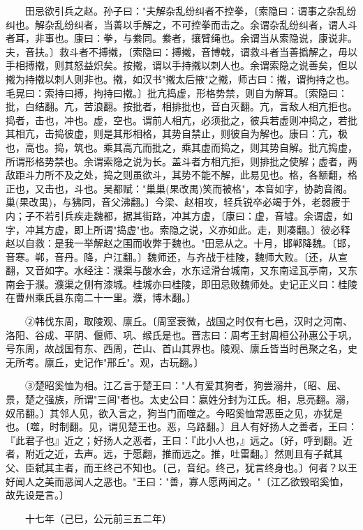 　　田忌欲引兵之赵。孙子曰："夫解杂乱纷纠者不控拳，〔索隐曰：谓事之杂乱纷纠也。解杂乱纷纠者，当善以手解之，不可控拳而击之。余谓杂乱纷纠者，谓人斗者耳，非事也。康曰：拳，与絭同。絭者，攘臂绳也。余谓当从索隐说，康说非。夫，音扶。〕救斗者不搏撠，〔索隐曰：搏撠，音博戟，谓救斗者当善撝解之，毋以手相搏撠，则其怒益炽矣。按撠，谓以手持撠以刺人也。余谓索隐之说善矣，但以撠为持撠以刺人则非也。撠，如汉书"撠太后掖"之撠，师古曰：撠，谓拘持之也。毛晃曰：索持曰搏，拘持曰撠。〕批亢捣虚，形格势禁，则自为解耳。〔索隐曰：批，白结翻。亢，苦浪翻。按批者，相排批也，音白灭翻。亢，言敌人相亢拒也。捣者，击也，冲也。虚，空也。谓前人相亢，必须批之，彼兵若虚则冲捣之，若批其相亢，击捣彼虚，则是其形相格，其势自禁止，则彼自为解也。康曰：亢，极也，高也。捣，筑也。乘其高亢而批之，乘其虚而捣之，则其势自解。批亢捣虚，所谓形格势禁也。余谓索隐之说为长。盖斗者方相亢拒，则排批之使解；虚者，两敌距斗力所不及之处，捣之则虽欲斗，其势不能不解，此易见也。格，各额翻，格正也，又击也，斗也。吴都赋："巢巢(果改禺)笑而被格"，本音如字，协韵音阁。巢(果改禺)，与狒同，音父沸翻。〕今梁、赵相攻，轻兵锐卒必竭于外，老弱疲于内；子不若引兵疾走魏都，据其街路，冲其方虚，〔康曰：虚，音墟。余谓虚，如字，冲其方虚，即上所谓"捣虚"也。索隐之说，义亦如此。走，则凑翻。〕彼必释赵以自救：是我一举解赵之围而收弊于魏也。"田忌从之。十月，邯郸降魏。〔邯，音寒。郸，音丹。降，户江翻。〕魏师还，与齐战于桂陵，魏师大败。〔还，从宣翻，又音如字。水经注：濮渠与酸水会，水东迳滑台城南，又东南迳瓦亭南，又东南会于濮。濮渠之侧有漆城。桂城亦曰桂陵，即田忌败魏师处。史记正义曰：桂陵在曹州乘氏县东南二十一里。濮，博木翻。〕

　　②韩伐东周，取陵观、廪丘。〔周室衰微，战国之时仅有七邑，汉时之河南、洛阳、谷成、平阴、偃师、巩、缑氏是也。晋志曰：周考王封周桓公孙惠公于巩，号东周，故战国有东、西周，芒山、首山其界也。陵观、廪丘皆当时邑聚之名，史无所考。廪丘，史记作"邢丘"。观，古玩翻。〕

　　③楚昭奚恤为相。江乙言于楚王曰："人有爱其狗者，狗尝溺井，〔昭、屈、景，楚之强族，所谓"三闾"者也。太史公曰：嬴姓分封为江氏。相，息亮翻。溺，奴吊翻。〕其邻人见，欲入言之，狗当门而噬之。今昭奚恤常恶臣之见，亦犹是也。〔噬，时制翻。见，谓见楚王也。恶，乌路翻。〕且人有好扬人之善者，王曰：『此君子也』近之；好扬人之恶者，王曰：『此小人也，』远之。〔好，呼到翻。近者，附近之近，去声。远，于愿翻，推而远之。推，吐雷翻。〕然则且有子弑其父、臣弑其主者，而王终己不知也。〔己，音纪。终己，犹言终身也。〕何者？以王好闻人之美而恶闻人之恶也。"王曰："善，寡人愿两闻之。"〔江乙欲毁昭奚恤，故先设是言。〕

　　十七年（己巳，公元前三五二年）

